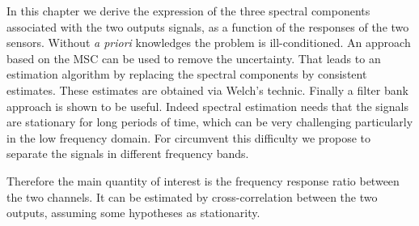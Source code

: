 

In this chapter we derive the expression of the three spectral components associated with the two outputs signals, as a function of the responses of the two sensors. Without \emph{a priori} knowledges  the problem is ill-conditioned. An approach based on the MSC can be used to remove the uncertainty. That leads to an estimation algorithm by replacing the spectral components by consistent estimates. These estimates are obtained via Welch's technic. Finally a filter bank approach is shown to be useful. Indeed spectral estimation  needs that the signals are stationary for long periods of time, which can be  very challenging particularly in the low frequency domain. For circumvent this difficulty we propose to separate the signals in different frequency bands.



Therefore the main quantity of interest is the frequency response ratio between the two channels. It can be estimated by cross-correlation between the two outputs, assuming some hypotheses as stationarity.




 \newpage\clearpage
